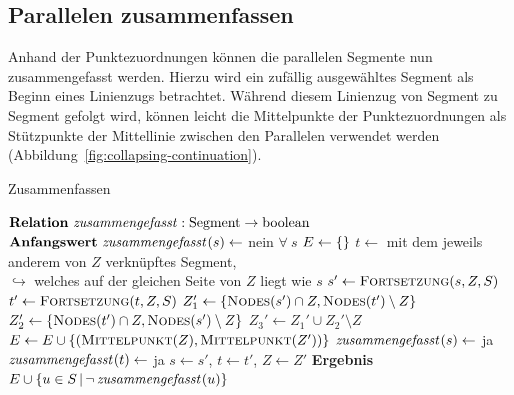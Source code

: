 \documentclass[../main/thesis.tex]{subfiles}
\begin{document}
\subsection{Parallelen zusammenfassen}
\label{ch:generalisation-algorithm}

Anhand der Punktezuordnungen können die parallelen Segmente nun zusammengefasst werden.
Hierzu wird ein zufällig ausgewähltes Segment als Beginn eines Linienzugs betrachtet.
Während diesem Linienzug von Segment zu Segment gefolgt wird, können leicht die Mittelpunkte der Punktezuordnungen als Stützpunkte der Mittellinie zwischen den Parallelen verwendet werden (Abbildung~\ref{fig:collapsing-continuation}).

\begin{algorithmhere}{Zusammenfassen}
\label{alg:Zusammenfassen}
\begin{algorithmic}
\State $\textbf{Relation}\ \relation{zusammengefasst} : \textrm{Segment} \rightarrow \textrm{boolean}$
\State $\textbf{Anfangswert}\ \relation{zusammengefasst}[s] \eqdefrel$ nein $\forall\ s$
	\State $E \gets \{\}$
			\State $t \gets$ mit dem jeweils anderem  von $Z$ verknüpftes Segment, \\\qquad\qquad\qquad\quad$\hookrightarrow$ welches auf der gleichen Seite von $Z$ liegt wie $s$
			\Repeat
				\State $s' \gets \textproc{Fortsetzung}(s,Z,S)$
				\State $t' \gets \textproc{Fortsetzung}(t,Z,S)$
				\State $Z_1' \gets \Set{\textproc{Nodes}(s') \cap Z, \textproc{Nodes}(t') \setminus Z}$
				\State $Z_2' \gets \Set{\textproc{Nodes}(t') \cap Z, \textproc{Nodes}(s') \setminus Z}$
				\State $Z_3' \gets Z_1' \cup Z_2' \setminus Z $
					\State $E \gets E \cup \Set{(\textproc{Mittelpunkt}(Z), \textproc{Mittelpunkt}(Z'))}$
					\State $\relation{zusammengefasst}[s] \gets$ ja
					\State $\relation{zusammengefasst}[t] \gets$ ja
					\State $s \gets s'$, $t \gets t'$, $Z \gets Z'$ 
				\EndIf
		\EndFor
	\EndFor
	\State \textbf{Ergebnis} $E \cup \Set{u \in S \SetCond \neg\, \relation{zusammengefasst}[u]}$
\EndFunction
\end{algorithmic}
\end{algorithmhere}
\end{document}
